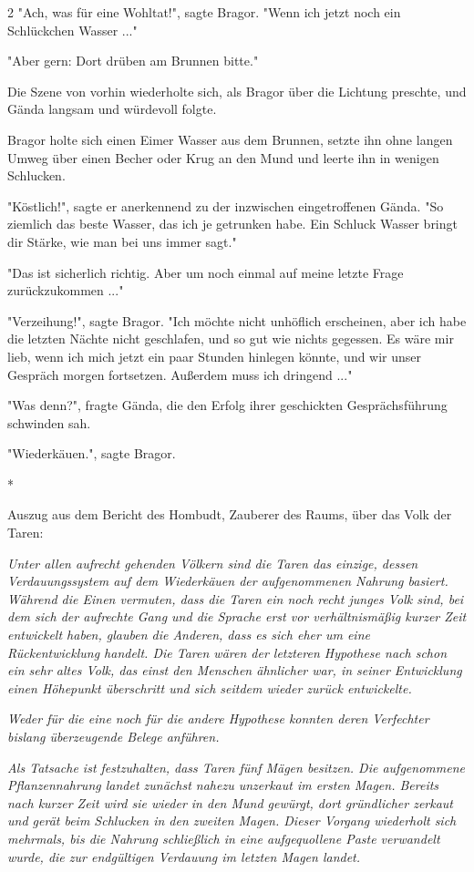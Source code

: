 \documentclass[10pt, a4paper, oneside]{book}
\begin{document}
\begin{multicols}{2}
"Ach, was für eine Wohltat!", sagte Bragor. "Wenn ich jetzt noch ein Schlückchen Wasser ..." 

"Aber gern: Dort drüben am Brunnen bitte." 

Die Szene von vorhin wiederholte sich, als Bragor über die Lichtung preschte, und Gända langsam und würdevoll folgte. 

Bragor holte sich einen Eimer Wasser aus dem Brunnen, setzte ihn ohne langen Umweg über einen Becher oder Krug an den Mund und leerte ihn in wenigen Schlucken. 

"Köstlich!", sagte er anerkennend zu der inzwischen eingetroffenen Gända. "So ziemlich das beste Wasser, das ich je getrunken habe. Ein Schluck Wasser bringt dir Stärke, wie man bei uns immer sagt." 

"Das ist sicherlich richtig. Aber um noch einmal auf meine letzte Frage zurückzukommen ..." 

"Verzeihung!", sagte Bragor. "Ich möchte nicht unhöflich erscheinen, aber ich habe die letzten Nächte nicht geschlafen, und so gut wie nichts gegessen. Es wäre mir lieb, wenn ich mich jetzt ein paar Stunden hinlegen könnte, und wir unser Gespräch morgen fortsetzen. Außerdem muss ich dringend ..." 

"Was denn?", fragte Gända, die den Erfolg ihrer geschickten Gesprächsführung schwinden sah. 

"Wiederkäuen.", sagte Bragor. 

\begin{center}
    *
\end{center}

Auszug aus dem Bericht des Hombudt, Zauberer des Raums, über das Volk der 
Taren: 

\textit{Unter allen aufrecht gehenden Völkern sind die Taren das einzige, dessen Verdauungssystem auf dem Wiederkäuen der aufgenommenen Nahrung basiert. Während die Einen vermuten, dass die Taren ein noch recht junges Volk sind, bei dem sich der aufrechte Gang und die Sprache erst vor verhältnismäßig kurzer Zeit entwickelt haben, glauben die Anderen, dass es sich eher um eine Rückentwicklung handelt. Die Taren wären der letzteren Hypothese nach schon ein sehr altes Volk, das einst den Menschen ähnlicher war, in seiner Entwicklung einen Höhepunkt überschritt und sich seitdem wieder zurück entwickelte.}

\textit{Weder für die eine noch für die andere Hypothese konnten deren Verfechter bislang überzeugende Belege anführen.}

\textit{Als Tatsache ist festzuhalten, dass Taren fünf Mägen besitzen. Die aufgenommene Pflanzennahrung landet zunächst nahezu unzerkaut im ersten Magen. Bereits nach kurzer Zeit wird sie wieder in den Mund gewürgt, dort gründlicher zerkaut und gerät beim Schlucken in den zweiten Magen. Dieser Vorgang wiederholt sich mehrmals, bis die Nahrung schließlich in eine aufgequollene Paste verwandelt wurde, die zur endgültigen Verdauung im letzten Magen landet.}


\end{multicols}
\end{document}
